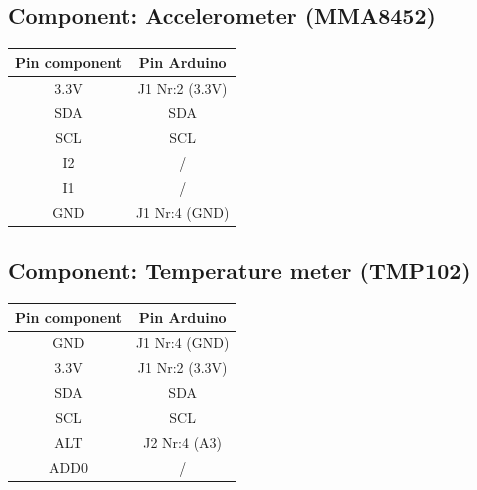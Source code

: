 \documentclass[a4paper]{report}
\begin{document}
\subsection{Component: Accelerometer (MMA8452)}
\begin{tabular}{|c|c|}
    \hline
    Pin component & Pin Arduino\\
    \hline
    3.3V & J1 Nr:2 (3.3V)\\
    SDA  & SDA\\
    SCL  & SCL\\
    I2   & /\\
    I1   & /\\
    GND  & J1 Nr:4 (GND)\\
    \hline
\end{tabular}

\subsection{Component: Temperature meter (TMP102)}
\begin{tabular}{|c|c|}
    \hline
    Pin component & Pin Arduino\\
    \hline
    GND  & J1 Nr:4  (GND)\\
    3.3V & J1 Nr:2  (3.3V)\\
    SDA  & SDA\\
    SCL  & SCL\\
    ALT  & J2 Nr:4  (A3)\\
    ADD0 & /\\
    \hline
\end{tabular}
\end{document}
